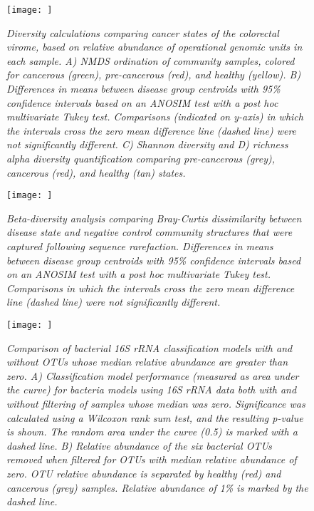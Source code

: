 \documentclass[12pt,]{article}
\begin{document}
\newpage

\begin{figure}[htbp]
\centering
\texttt{[image: ]}
\caption{\emph{Diversity calculations comparing cancer states of the
colorectal virome, based on relative abundance of operational genomic
units in each sample. A) NMDS ordination of community samples, colored
for cancerous (green), pre-cancerous (red), and healthy (yellow). B)
Differences in means between disease group centroids with 95\%
confidence intervals based on an ANOSIM test with a post hoc
multivariate Tukey test. Comparisons (indicated on y-axis) in which the
intervals cross the zero mean difference line (dashed line) were not
significantly different. C) Shannon diversity and D) richness alpha
diversity quantification comparing pre-cancerous (grey), cancerous
(red), and healthy (tan) states.}\label{betaogu}}
\end{figure}

\newpage

\begin{figure}[htbp]
\centering
\texttt{[image: ]}
\caption{\emph{Beta-diversity analysis comparing Bray-Curtis
dissimilarity between disease state and negative control community
structures that were captured following sequence rarefaction.
Differences in means between disease group centroids with 95\%
confidence intervals based on an ANOSIM test with a post hoc
multivariate Tukey test. Comparisons in which the intervals cross the
zero mean difference line (dashed line) were not significantly
different.}\label{betaogunegative}}
\end{figure}

\newpage

\begin{figure}[htbp]
\centering
\texttt{[image: ]}
\caption{\emph{Comparison of bacterial 16S rRNA classification models
with and without OTUs whose median relative abundance are greater than
zero. A) Classification model performance (measured as area under the
curve) for bacteria models using 16S rRNA data both with and without
filtering of samples whose median was zero. Significance was calculated
using a Wilcoxon rank sum test, and the resulting p-value is shown. The
random area under the curve (0.5) is marked with a dashed line. B)
Relative abundance of the six bacterial OTUs removed when filtered for
OTUs with median relative abundance of zero. OTU relative abundance is
separated by healthy (red) and cancerous (grey) samples. Relative
abundance of 1\% is marked by the dashed line.}\label{16scompare}}
\end{figure}
\end{document}
